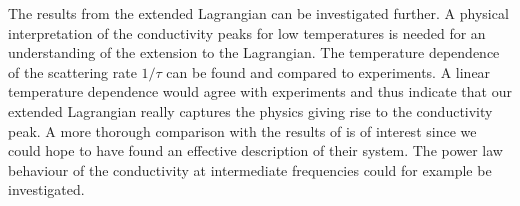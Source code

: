 \documentclass[12pt]{report}
\begin{document}
The results from the extended Lagrangian can be investigated further. A physical interpretation of the conductivity peaks for low temperatures is needed for an understanding of the extension to the Lagrangian. The temperature dependence of the scattering rate $1/\tau$ can be found and compared to experiments. A linear temperature dependence would agree with experiments and thus indicate that our extended Lagrangian really captures the physics giving rise to the conductivity peak. A more thorough comparison with the results of \cite{horowitz} is of interest since we could hope to have found an effective description of their system. The power law behaviour of the conductivity at intermediate frequencies could for example be investigated.
\end{document}

